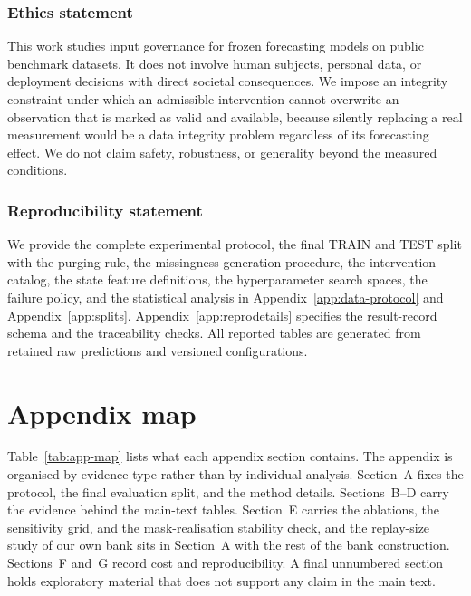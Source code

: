 \documentclass{article}
\newcommand{\ph}[1]{\textcolor{phgray}{\textsf{[\detokenize{#1}]}}}
\begin{document}
\subsubsection*{Ethics statement}
This work studies input governance for frozen forecasting models on public benchmark datasets.
It does not involve human subjects, personal data, or deployment decisions with direct
societal consequences. We impose an integrity constraint under which an admissible
intervention cannot overwrite an observation that is marked as valid and available, because
silently replacing a real measurement would be a data integrity problem regardless of its
forecasting effect. We do not claim safety, robustness, or generality beyond the measured
conditions.

\subsubsection*{Reproducibility statement}
We provide the complete experimental protocol, the final TRAIN and TEST split with the
purging rule, the missingness generation procedure, the intervention catalog, the state
feature definitions, the hyperparameter search spaces, the failure policy, and the statistical
analysis in Appendix~\ref{app:data-protocol} and Appendix~\ref{app:splits}.
Appendix~\ref{app:reprodetails} specifies the result-record schema and the traceability checks.
All reported tables are generated from retained raw predictions and versioned configurations.







\appendix

\newpage



\section*{Appendix map}
\label{app:map}
Table~\ref{tab:app-map} lists what each appendix section contains. The appendix is organised
by evidence type rather than by individual analysis. Section~A fixes the protocol, the final
evaluation split, and the method details. Sections~B--D carry the evidence behind the
main-text tables. Section~E carries the ablations, the sensitivity grid, and the
mask-realisation stability check, and the replay-size study of our own bank sits in
Section~A with the rest of the bank construction. Sections~F and~G record cost and
reproducibility. A final unnumbered section holds exploratory material that does not support
any claim in the main text.
\end{document}
